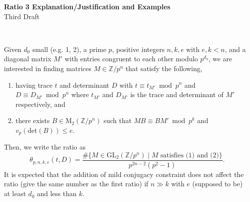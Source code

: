 \documentclass[letterpaper,12pt]{article}
\newcommand{\Z}{\mathbb{Z}}
\begin{document}

\begin{center}
    {\LARGE \textbf{Ratio 3 Explanation/Justification and Examples}} \\
    Third Draft
\end{center}

\

Given $d_0$ small (e.g. 1, 2), a prime $p$,
positive integers $n, k, e$ with $e, k < n$, and a diagonal matrix $M'$ with 
entries congruent to each other modulo $p^{d_0}$, we are interested in finding matrices 
$M \in \mathbb{Z}/p^n$ that satisfy the following,
\begin{enumerate}
\item having trace $t$ and determinant $D$ with 
$t \equiv t_{M'} \bmod p^n$ and $D \equiv D_{M'} \bmod p^n$
where $t_{M'}$ and $D_{M'}$ is the trace and determinant of $M'$ respectively, and 
\item there exists $B \in \text{M}_2(\Z/p^n)$ such that 
$MB \equiv BM' \bmod p^k$ and $v_p(\text{det}(B)) \leq e$.
\end{enumerate}
Then, we write the ratio as 
\[
\theta_{p, n, k, e}(t, D) = 
\frac{\#\{M \in \text{GL}_2(\Z / p^n) \; | \; M \text{ satisfies (1) and (2)}\}}{p^{2n-2}(p^2-1)}.
\]
It is expected that the addition of mild conjugacy constraint does not affect
the ratio (give the same number as the first ratio) if $n \gg k$ 
with $e$ (supposed to be) at least $d_0$ and less than $k$.

\
\end{document}

